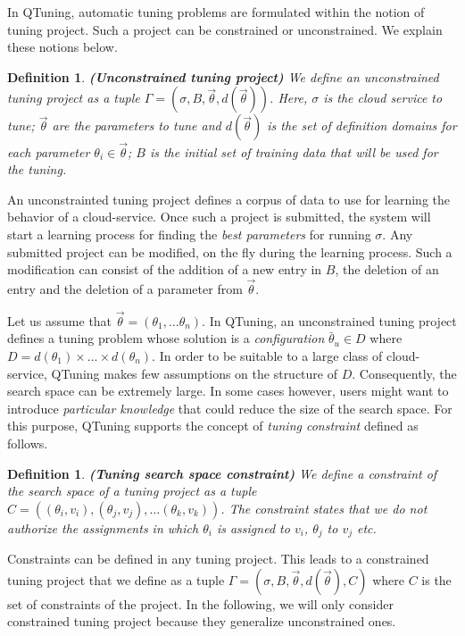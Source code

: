 \documentclass[10pt, conference, compsocconf]{IEEEtran}
\newtheorem{definition}[theorem]{Definition}
\begin{document}
In QTuning, automatic tuning problems are formulated within the notion of tuning project.  Such  
a project can be  constrained or unconstrained. We explain these notions below.

\begin{definition}{\bf (Unconstrained tuning project)}
We define an unconstrained tuning project as a tuple $ \Gamma = (\sigma, B, \vec{\theta}, d(\vec{\theta}))$. Here, $\sigma$ is the cloud service to tune; 
$\vec{\theta}$ are the parameters to tune and $d(\vec{\theta})$ is the set of definition domains for each parameter 
$\theta_i \in \vec{\theta}$; $B$ is the initial set of training data that will be used for the tuning.
\end{definition}

An unconstrainted tuning project defines a corpus of data to use for learning the behavior of a cloud-service. 
Once such a project is submitted, the system will start a learning process for finding the {\it best parameters} for 
running $\sigma$. Any submitted project can be modified, on the fly during the learning process. Such a modification can consist of  
the addition of a new entry in $B$, the deletion of an entry and the deletion of a parameter from $\vec{\theta}$. 

Let us assume that $\vec{\theta} = (\theta_1,\dots \theta_n)$. In QTuning, an unconstrained tuning project defines 
a tuning problem whose solution is a {\it configuration} $\bar{\theta}_u \in D$ where $D = d(\theta_1) \times \dots  \times d(\theta_n)$. 
In order to be suitable to a large class of cloud-service, QTuning makes few assumptions on the structure of $D$. 
Consequently, the search space can be extremely large. 
In some cases however, users might want to introduce {\it particular knowledge} that could reduce the size of the search space. 
For this purpose, QTuning supports the concept of {\it tuning constraint} defined as follows.

\begin{definition}{\bf (Tuning search space constraint)}
We define a constraint of the search space of a tuning project as a tuple $C = ((\theta_i, v_i), (\theta_j, v_j),\dots (\theta_k, v_k))$. 
The constraint states that we do not authorize the assignments in which $\theta_i$ is assigned to $v_i$, $\theta_j$ to $v_j$ etc.
\end{definition}


Constraints can be defined in any tuning project. This leads to a constrained tuning project that we define 
 as a tuple $ \Gamma = (\sigma, B, \vec{\theta}, d(\vec{\theta}), C)$ where $C$ is the set of constraints of the project. 
In the following, we will only consider constrained tuning project because they generalize unconstrained ones. 
\end{document}
